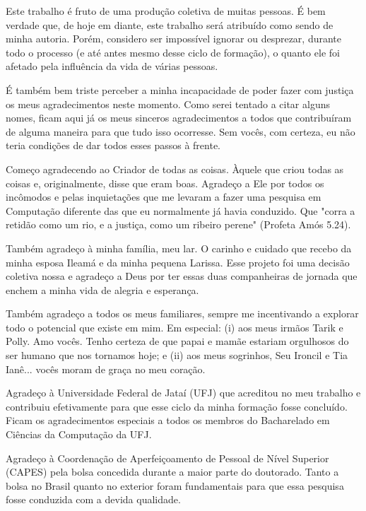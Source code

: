 \begin{agradecimentos}

Este trabalho é fruto de uma produção coletiva de muitas pessoas. É bem verdade que, de hoje em diante, este trabalho será atribuído como sendo de minha autoria. Porém, considero ser impossível ignorar ou desprezar, durante todo o processo (e até antes mesmo desse ciclo de formação), o quanto ele foi afetado pela influência da vida de várias pessoas.

É também bem triste perceber a minha incapacidade de poder fazer com justiça os meus agradecimentos neste momento. Como serei tentado a citar alguns nomes, ficam aqui já os meus sinceros agradecimentos a todos que contribuíram de alguma maneira para que tudo isso ocorresse. Sem vocês, com certeza, eu não teria condições de dar todos esses passos à frente.

Começo agradecendo ao Criador de todas as coisas. Àquele que criou todas as coisas e, ori\-ginalmente, disse que eram boas. Agradeço a Ele por todos os incômodos e pelas inquietações que me levaram a fazer uma pesquisa em Computação diferente das que eu normalmente já havia conduzido. Que "corra a retidão como um rio, e a justiça, como um ribeiro perene" (Profeta Amós 5.24).

Também agradeço à minha família, meu lar. O carinho e cuidado que recebo da minha esposa Ileamá e da minha pequena Larissa. Esse projeto foi uma decisão coletiva nossa e agradeço a Deus por ter essas duas companheiras de jornada que enchem a minha vida de alegria e esperança.

Também agradeço a todos os meus familiares, sempre me incentivando a explorar todo o potencial que existe em mim. Em especial: (i) aos meus irmãos Tarik e Polly. Amo vocês. Tenho certeza de que papai e mamãe estariam orgulhosos do ser humano que nos tornamos hoje; e (ii) aos meus sogrinhos, Seu Ironcil e Tia Ianê... vocês moram de graça no meu coração.

Agradeço à Universidade Federal de Jataí (UFJ) que acreditou no meu trabalho e contribuiu efetivamente para que esse ciclo da minha formação fosse concluído. Ficam os agradecimentos especiais a todos os membros do Bacharelado em Ciências da Computação da UFJ.

Agradeço à Coordenação de Aperfeiçoamento de Pessoal de Nível Superior (CAPES) pela bolsa concedida durante a maior parte do doutorado. Tanto a bolsa no Brasil quanto no exterior foram fundamentais para que essa pesquisa fosse conduzida com a devida qualidade.


\end{agradecimentos}
